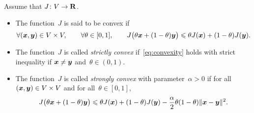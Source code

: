 \begin{definition}
    [Convexity]
    Assume that $J\colon V \to \mathbf R$.
    \begin{itemize}
        \item
            The function~$J$ is said to be convex if
            \begin{equation}
                \label{eq:convexity}
                \forall (\mathbf{\boldsymbol{x}}, \mathbf{\boldsymbol{y}}) \in V \times V,
                \qquad \forall \theta \in [0, 1],
                \qquad
                J\bigl(\theta \mathbf{\boldsymbol{x}} + (1 - \theta) \mathbf{\boldsymbol{y}}\bigr)
                \leqslant \theta J(\mathbf{\boldsymbol{x}}) + (1 - \theta) J(\mathbf{\boldsymbol{y}}).
            \end{equation}

        \item
            The function~$J$ is called \emph{strictly convex} if~\eqref{eq:convexity} holds with strict inequality
            if $\mathbf{\boldsymbol{x}} \neq \mathbf{\boldsymbol{y}}$ and~$\theta \in (0, 1)$.

        \item
            The function~$J$ is called \emph{strongly convex} with parameter~$\alpha > 0$ if
            for all $(\mathbf{\boldsymbol{x}}, \mathbf{\boldsymbol{y}}) \in V \times V$ and for all~$\theta \in [0, 1]$,
            \begin{equation}
                \label{eq:strong_convexity}
                J\bigl(\theta \mathbf{\boldsymbol{x}} + (1 - \theta) \mathbf{\boldsymbol{y}}\bigr)
                \leqslant \theta J(\mathbf{\boldsymbol{x}}) + (1 - \theta) J(\mathbf{\boldsymbol{y}})
                - \frac{\alpha}{2} \theta (1 - \theta) \lVert\mathbf{\boldsymbol{x}} - \mathbf{\boldsymbol{y}}\rVert^2.
            \end{equation}
    \end{itemize}
\end{definition}

